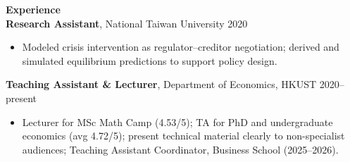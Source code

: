 \documentclass[11pt,letterpaper]{article}
\begin{document}
\vspace{0.15pt}

{\large \textbf{Experience}}\\[-0.5pt]
\textbf{Research Assistant}, National Taiwan University \hfill 2020\\
\vspace{-6pt}
\begin{itemize}
  \item Modeled crisis intervention as regulator--creditor negotiation; derived and simulated equilibrium predictions to support policy design.
\end{itemize}
\textbf{Teaching Assistant \& Lecturer}, Department of Economics, HKUST \hfill 2020--present\\
\vspace{-6pt}
\begin{itemize}
  \item Lecturer for MSc Math Camp (4.53/5); TA for PhD and undergraduate economics (avg 4.72/5); present technical material clearly to non-specialist audiences; Teaching Assistant Coordinator, Business School (2025--2026).
\end{itemize}

\vspace{0.15pt}
\end{document}
